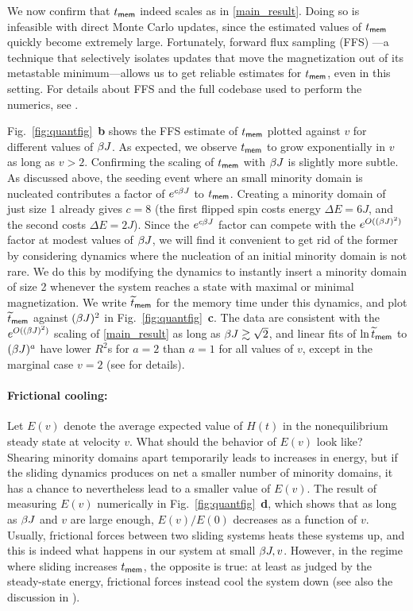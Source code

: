 \documentclass[prl,aps,twocolumn,groupedaddress,superscriptaddress,preprintnumbers,nobibnotes]{revtex4-2}
\newcommand{\tmem}{{t_{\sf mem}}}
\begin{document}
	We now confirm that $\tmem$ indeed scales as in \eqref{main_result}. Doing so is infeasible with direct Monte Carlo updates, since the estimated values of $\tmem$ quickly become extremely large. Fortunately, forward flux sampling (FFS) \cite{allen2009forward}---a technique that selectively isolates updates that move the magnetization out of its metastable minimum---allows us to get reliable estimates for $\tmem$, even in this setting. For details about FFS and the full codebase used to perform the numerics, see \cite{code}. 
	
	Fig.~\ref{fig:quantfig}~{\bf b} shows the FFS estimate of $\tmem$ plotted against $v$ for different values of $\beta J$. As expected, we observe $\tmem$ to grow exponentially in $v$ as long as $v>2$. 
	Confirming the scaling of $\tmem$ with $\beta J$ is slightly more subtle. As discussed above, the seeding event where an small minority domain is nucleated contributes a factor of $e^{c\beta J}$ to $\tmem$. Creating a minority domain of just size 1 already gives $c = 8$ (the first flipped spin costs energy $\Delta E = 6J$, and the second costs $\Delta E = 2J$). Since the $e^{c \beta J}$ factor can compete with the $e^{O((\beta J)^2)}$ factor at modest values of $\beta J$, we will find it convenient to get rid of the former by considering dynamics where the nucleation of an initial minority domain is not rare. We do this by modifying the dynamics to instantly insert a minority domain of size 2 whenever the system reaches a state with maximal or minimal magnetization. We write $\widetilde t_{\sf mem}$ for the memory time under this dynamics, and plot $\widetilde t_{\sf mem}$ against $(\beta J)^2$ in Fig.~\ref{fig:quantfig}~{\bf c}. The data are consistent with the $e^{O((\beta J)^2)}$ scaling of \eqref{main_result} as long as $\beta J \gtrsim \sqrt 2$, and linear fits of $\ln \widetilde t_{\sf mem}$ to $(\beta J)^a$ have lower $R^2$s for $a = 2$ than $a=1$ for all values of $v$, except in the marginal case $v=2$ (see \cite{code} for details).
		
	
	\paragraph*{Frictional cooling: } 
	Let $E(v)$ denote the average expected value of $H(t)$ in the nonequilibrium steady state at velocity $v$. What should the behavior of $E(v)$ look like? Shearing minority domains apart temporarily leads to increases in energy, but if the sliding dynamics produces on net a smaller number of minority domains, it has a chance to nevertheless lead to a smaller value of $E(v)$. The result of measuring $E(v)$ numerically in Fig.~\ref{fig:quantfig}~{\bf d}, which shows that as long as $\beta J$ and $v$ are large enough, $E(v)/E(0)$ decreases as a function of $v$. 
	Usually, frictional forces between two sliding systems heats these systems up, and this is indeed what happens in our system at small $\beta J,v$. However, in the regime where sliding increases $\tmem$, the opposite is true: at least as judged by the steady-state energy, frictional forces instead cool the system down (see also the discussion in  \cite{kadau2008magnetic}). 
	
\end{document}
